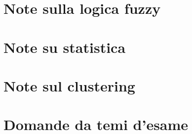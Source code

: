 \providecommand{\main}{.}





{\hypersetup{hidelinks}
  \tableofcontents  %
}

\chapter{Note sulla logica fuzzy}


\chapter{Note su statistica}


\chapter{Note sul clustering}


\chapter{Domande da temi d'esame}


\clearpage

\clearpage

\clearpage

\clearpage

\clearpage

\clearpage

\clearpage




